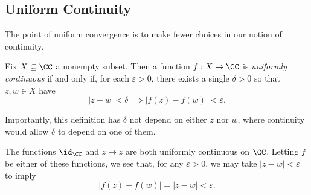\subsection{Uniform Continuity}
The point of uniform convergence is to make fewer choices in our notion of continuity.
\begin{definition}
	Fix $X\subseteq\CC$ a nonempty subset. Then a function $f:X\to\CC$ is \textit{uniformly continuous} if and only if, for each $\varepsilon>0$, there exists a single $\delta>0$ so that $z,w\in X$ have
	\[|z-w|<\delta\implies|f(z)-f(w)|<\varepsilon.\]
\end{definition}
Importantly, this definition has $\delta$ not depend on either $z$ nor $w$, where continuity would allow $\delta$ to depend on one of them.
\begin{example} \label{ex:conjcont}
	The functions $\id_\CC$ and $z\mapsto\overline z$ are both uniformly continuous on $\CC$. Letting $f$ be either of these functions, we see that, for any $\varepsilon>0$, we may take $|z-w|<\varepsilon$ to imply
	\[|f(z)-f(w)|=|z-w|<\varepsilon.\]
\end{example}

